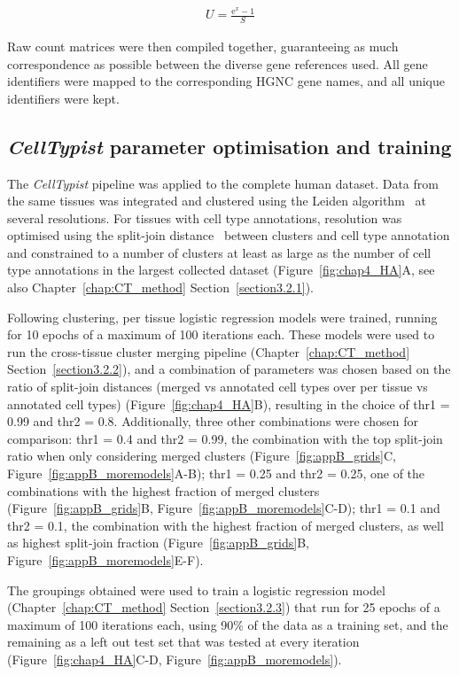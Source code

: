 \begin{align}
U = \frac{\mathrm{e}^{x} - 1}{S}
\end{align}

Raw count matrices were then compiled together, guaranteeing as much correspondence as possible between the diverse gene references used. All gene identifiers were mapped to the corresponding HGNC gene names, and all unique identifiers were kept.


\subsection{\textit{CellTypist} parameter optimisation and training}
\label{section4.4_model}
The \textit{CellTypist} pipeline was applied to the complete human dataset. Data from the same tissues was integrated and clustered using the Leiden algorithm~\citep{traag_louvain_2019} at several resolutions. For tissues with cell type annotations, resolution was optimised using the split-join distance~\citep{dongen_performance_2000} between clusters and cell type annotation and constrained to a number of clusters at least as large as the number of cell type annotations in the largest collected dataset (Figure~\ref{fig:chap4_HA}A, see also Chapter~\ref{chap:CT_method} Section~\ref{section3.2.1}).

Following clustering, per tissue logistic regression models were trained, running for 10 epochs of a maximum of 100 iterations each. These models were used to run the cross-tissue cluster merging pipeline (Chapter~\ref{chap:CT_method} Section~\ref{section3.2.2}), and a combination of parameters was chosen based on the ratio of split-join distances (merged vs annotated cell types over per tissue vs annotated cell types) (Figure~\ref{fig:chap4_HA}B), resulting in the choice of thr1 = 0.99 and thr2 = 0.8. Additionally, three other combinations were chosen for comparison: thr1 = 0.4 and thr2 = 0.99, the combination with the top split-join ratio when only considering merged clusters (Figure~\ref{fig:appB_grids}C, Figure~\ref{fig:appB_moremodels}A-B); thr1 = 0.25 and thr2 = 0.25, one of the combinations with the highest fraction of merged clusters (Figure~\ref{fig:appB_grids}B, Figure~\ref{fig:appB_moremodels}C-D); thr1 = 0.1 and thr2 = 0.1, the combination with the highest fraction of merged clusters, as well as highest split-join fraction (Figure~\ref{fig:appB_grids}B, Figure~\ref{fig:appB_moremodels}E-F).

The groupings obtained were used to train a logistic regression model (Chapter~\ref{chap:CT_method} Section~\ref{section3.2.3}) that run for 25 epochs of a maximum of 100 iterations each, using 90\% of the data as a training set, and the remaining as a left out test set that was tested at every iteration (Figure~\ref{fig:chap4_HA}C-D, Figure~\ref{fig:appB_moremodels}).


